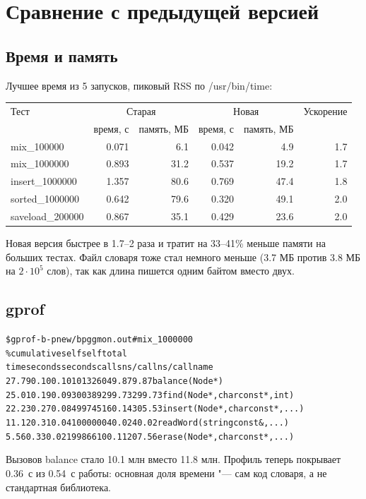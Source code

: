 \section{Сравнение с предыдущей версией}

\subsection{Время и память}
Лучшее время из 5 запусков, пиковый RSS по {\ttfamily /usr/bin/time}:

\begin{longtable}{|l|r|r|r|r|r|}
\hline
\rowcolor{lightgray}
Тест & \multicolumn{2}{c|}{Старая} & \multicolumn{2}{c|}{Новая} & Ускорение\\
\rowcolor{lightgray}
 & время, с & память, МБ & время, с & память, МБ & \\
\hline
{\ttfamily mix\_100000}      & 0.071 & 6.1  & 0.042 & 4.9  & 1.7\\
{\ttfamily mix\_1000000}     & 0.893 & 31.2 & 0.537 & 19.2 & 1.7\\
{\ttfamily insert\_1000000}  & 1.357 & 80.6 & 0.769 & 47.4 & 1.8\\
{\ttfamily sorted\_1000000}  & 0.642 & 79.6 & 0.320 & 49.1 & 2.0\\
{\ttfamily saveload\_200000} & 0.867 & 35.1 & 0.429 & 23.6 & 2.0\\
\hline
\end{longtable}

Новая версия быстрее в 1.7--2 раза и тратит на 33--41\% меньше памяти на больших тестах.
Файл словаря тоже стал немного меньше (3.7 МБ против 3.8 МБ на $2\cdot10^5$ слов), так как длина
пишется одним байтом вместо двух.

\subsection{gprof}
\begin{alltt}
\$ gprof -b -p new/bpg gmon.out           # mix_1000000
  \%   cumulative   self              self     total
 time   seconds   seconds    calls  ns/call  ns/call  name
 27.79      0.10     0.10 10132604     9.87     9.87  balance(Node*)
 25.01      0.19     0.09   300389   299.73   299.73  find(Node*, char const*, int)
 22.23      0.27     0.08   499745   160.14   305.53  insert(Node*, char const*, ...)
 11.12      0.31     0.04  1000000    40.02    40.02  readWord(string const&, ...)
  5.56      0.33     0.02   199866   100.11   207.56  erase(Node*, char const*, ...)
\end{alltt}
Вызовов {\ttfamily balance} стало 10.1 млн вместо 11.8 млн. Профиль теперь покрывает 0.36~с из
0.54~с работы: основная доля времени "--- сам код словаря, а не стандартная библиотека.

